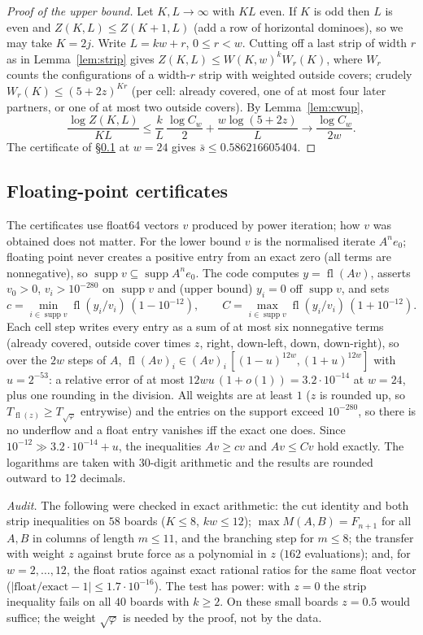 \documentclass[11pt]{amsart}
\theoremstyle{definition}
\theoremstyle{remark}
\newcommand{\fl}{\operatorname{fl}}
\newcommand{\supp}{\operatorname{supp}}
\begin{document}
\begin{proof}[Proof of the upper bound]
Let $K, L \to \infty$ with $KL$ even. If $K$ is odd then $L$ is even and $Z(K, L) \le Z(K+1, L)$
(add a row of horizontal dominoes), so we may take $K = 2j$. Write $L = kw + r$, $0 \le r < w$.
Cutting off a last strip of width $r$ as in Lemma~\ref{lem:strip} gives
$Z(K, L) \le W(K, w)^k W_r(K)$, where $W_r$ counts the configurations of a width-$r$ strip with
weighted outside covers; crudely $W_r(K) \le (5 + 2z)^{Kr}$ (per cell: already covered, one of at
most four later partners, or one of at most two outside covers). By Lemma~\ref{lem:cwup},
\[
  \frac{\log Z(K, L)}{KL} \le \frac{k}{L}\,\frac{\log C_w}{2} + \frac{w \log(5 + 2z)}{L}
  \longrightarrow \frac{\log C_w}{2w}.
\]
The certificate of \S\ref{sec:float} at $w = 24$ gives $\bar s \le 0.586216605404$.
\end{proof}

\subsection{Floating-point certificates}\label{sec:float}
The certificates use float64 vectors $v$ produced by power iteration; how $v$ was obtained does not
matter. For the lower bound $v$ is the normalised iterate $A^n e_0$; floating point never creates a
positive entry from an exact zero (all terms are nonnegative), so $\supp v \subseteq \supp A^n e_0$.
The code computes $y = \fl(Av)$, asserts $v_0 > 0$, $v_i > 10^{-280}$ on $\supp v$ and (upper
bound) $y_i = 0$ off $\supp v$, and sets
\[
  c = \min_{i \in \supp v} \fl(y_i / v_i)\,(1 - 10^{-12}), \qquad
  C = \max_{i \in \supp v} \fl(y_i / v_i)\,(1 + 10^{-12}).
\]
Each cell step writes every entry as a sum of at most six nonnegative terms (already covered,
outside cover times $z$, right, down-left, down, down-right), so over the $2w$ steps of $A$,
$\fl(Av)_i \in (Av)_i\,[(1-u)^{12w}, (1+u)^{12w}]$ with $u = 2^{-53}$: a relative error of at most
$12wu\,(1 + o(1)) = 3.2\cdot10^{-14}$ at $w = 24$, plus one rounding in the division. All weights
are at least $1$ ($z$ is rounded up, so $T_{\fl(z)} \ge T_{\sqrt\varphi}$ entrywise) and the
entries on the support exceed $10^{-280}$, so there is no underflow and a float entry vanishes iff
the exact one does. Since $10^{-12} \gg 3.2\cdot10^{-14} + u$, the inequalities $Av \ge cv$ and
$Av \le Cv$ hold exactly. The logarithms are taken with 30-digit arithmetic and the results are
rounded outward to 12 decimals.

\emph{Audit.} The following were checked in exact arithmetic: the cut identity and both strip
inequalities on $58$ boards ($K \le 8$, $kw \le 12$); $\max M(A, B) = F_{n+1}$ for all $A, B$ in
columns of length $m \le 11$, and the branching step for $m \le 8$; the transfer with weight $z$
against brute force as a polynomial in $z$ ($162$ evaluations); and, for $w = 2, \dots, 12$, the
float ratios against exact rational ratios for the same float vector ($|\text{float}/\text{exact}
- 1| \le 1.7\cdot10^{-16}$). The test has power: with $z = 0$ the strip inequality fails on all
$40$ boards with $k \ge 2$. On these small boards $z = 0.5$ would suffice; the weight $\sqrt\varphi$ is
needed by the proof, not by the data.
\end{document}
